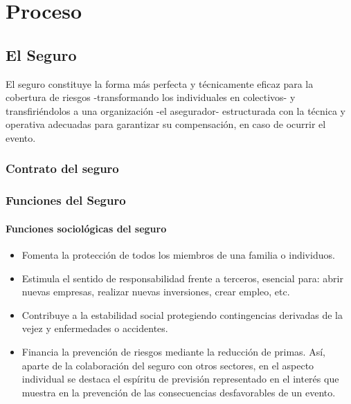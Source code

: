 \chapter{Proceso}

\section{El Seguro}	

El seguro constituye la forma más perfecta y técnicamente eficaz para la cobertura de riesgos -transformando los individuales en colectivos- y transfiriéndolos a una organización -el asegurador- estructurada con la técnica y operativa adecuadas para garantizar su compensación, en caso de ocurrir el evento.

\subsection{Contrato del seguro}
\setlength{\parskip}{5mm}

\setlength{\parskip}{0mm}


\subsection{Funciones del Seguro}
\setlength{\parskip}{5mm}




\setlength{\parskip}{0mm}

\subsubsection{Funciones sociológicas del seguro}

\begin{itemize}
	\item Fomenta la  protección de todos los miembros de una familia o individuos.

	\item Estimula el sentido de responsabilidad frente a terceros, esencial para: abrir nuevas empresas, realizar nuevas inversiones, crear empleo, etc.

	\item Contribuye a la estabilidad social protegiendo contingencias derivadas de la vejez y enfermedades o 
	accidentes.

	\item Financia la prevención de riesgos mediante la reducción de primas. Así, aparte de la colaboración del seguro con otros sectores, en el aspecto individual se destaca el espíritu de previsión representado en el interés que muestra en la prevención de las consecuencias desfavorables de un evento.

\end{itemize}

